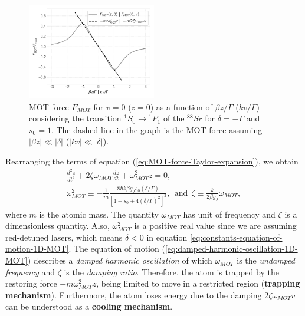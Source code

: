 \begin{figure}[!ht]
	\centering
	\vspace{-10px}
	\includegraphics[width=0.5\textwidth]{USPSC-img/MOT_force.png}
	\caption{MOT force $ F_{MOT} $ for $ v = 0 $ ($ z = 0 $) as a function of $ \beta z / \Gamma $ ($ k v / \Gamma $) considering the transition $ {}^{1}S_0 \rightarrow {}^{1}P_1 $ of the $ {}^{88}Sr $ for $ \delta = - \Gamma $ and $ s_0 = 1 $. The dashed line in the graph is the MOT force assuming $ |\beta z| \ll |\delta| $ ($ |kv| \ll |\delta| $).}
	\label{fig:MOT-force}
\end{figure}

Rearranging the terms of equation (\ref{eq:MOT-force-Taylor-expansion}), we obtain
\begin{gather}
	\frac{d^2 z}{dt^2} + 2\zeta \omega_{MOT} \frac{d z}{d t} + \omega_{MOT}^2 z = 0,
	\label{eq:damped-harmonic-oscillation-1D-MOT}
	\\
	\omega_{MOT}^2 \equiv - \frac{1}{m} \frac{8 \hbar k \beta g_J s_0 (\delta / \Gamma)}{[1 + s_0 + 4(\delta / \Gamma)^2]^2},\ \ \textrm{and}\ \ \zeta \equiv \frac{k}{2\beta g_J} \omega_{MOT},
	\label{eq:constants-equation-of-motion-1D-MOT}
\end{gather}
where $ m $ is the atomic mass. The quantity $ \omega_{MOT} $ has unit of frequency and $ \zeta $ is a dimensionless quantity. Also, $ \omega_{MOT}^2 $ is a positive real value since we are assuming red-detuned lasers, which means $ \delta < 0 $ in equation \ref{eq:constants-equation-of-motion-1D-MOT}. The equation of motion (\ref{eq:damped-harmonic-oscillation-1D-MOT}) describes a \textit{damped harmonic oscillation} of which $ \omega_{MOT} $ is the \textit{undamped frequency} and $ \zeta $ is the \textit{damping ratio}. Therefore, the atom is trapped by the restoring force $ - m \omega_{MOT}^2 z $, being limited to move in a restricted region (\textbf{trapping mechanism}). Furthermore, the atom loses energy due to the damping $ 2 \zeta \omega_{MOT} v $ can be understood as a \textbf{cooling mechanism}.
